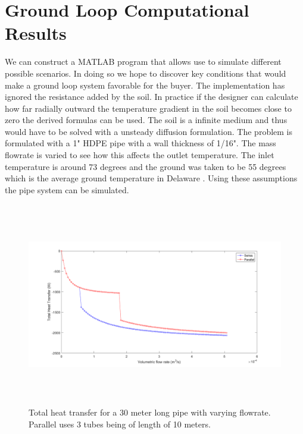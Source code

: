 \section{Ground Loop Computational Results}
%
We can construct a MATLAB program that allows use to simulate different possible scenarios. In doing so we hope to discover key conditions that would make a ground loop system favorable for the buyer. The implementation has ignored the resistance added by the soil. In practice if the designer can calculate how far radially outward the temperature gradient in the soil becomes close to zero the derived formulas can be used. The soil is a infinite medium and thus would have to be solved with a unsteady diffusion formulation. The problem is formulated with a 1" HDPE pipe with a wall thickness of 1/16". The mass flowrate is varied to see how this affects the outlet temperature. The inlet temperature is around 73 degrees and the ground was taken to be 55 degrees which is the average ground temperature in Delaware \cite{SoilTemps}. Using these assumptions the pipe system can be simulated.
%
\begin{figure}[H]
    \centering
    \includegraphics[height=3.5in]{pictures/heat_11_ground_23_inlet.png}
    \caption{Total heat transfer for a 30 meter long pipe with varying flowrate. Parallel uses 3 tubes being of length of 10 meters.}
\end{figure}
%
